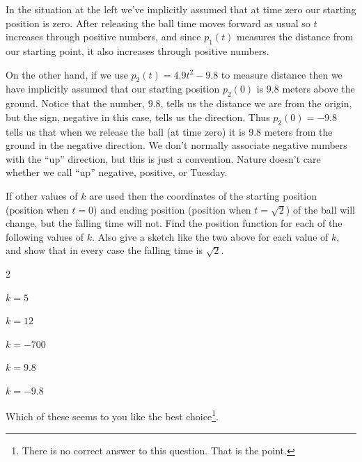 \begin{Digression}
  In the situation at the left we've implicitly assumed that at time
  zero our starting position is zero. After releasing the ball time
  moves forward as usual so $t$ increases through positive numbers,
  and since $p_1(t)$ measures the distance from our starting point, it
  also increases through positive numbers.

  On the other hand, if we use $p_2(t)=4.9t^2-9.8$ to measure distance
  then we have implicitly assumed that our starting position $p_2(0)$
  is $9.8$ meters above the ground. Notice that the number, $9.8$,
  tells us the distance we are from the origin, but the sign, negative
  in this case, tells us the direction. Thus $p_2(0)=-9.8$ tells us
  that when we release the ball (at time zero) it is 9.8 meters from
  the ground in the \alert{negative} direction. We don't normally
  associate negative numbers with the ``up'' direction, but this is
  just a convention. Nature doesn't care whether we call ``up''
  negative, positive, or Tuesday.

\begin{ProficiencyDrill}{}
  If other values of $k$ are used then the coordinates of the starting
  position (position when $t=0$) and ending position (position when
  $t=\sqrt{2}$) of the ball will change, but the falling time will
  not. Find the position function for each of the following values of
  $k.$ Also give a sketch like the two above for each value of $k,$
  and show that in every case the falling time is $\sqrt{2}.$
  \begin{enumerate}[label={\bf{}(\alph*)}]
  \begin{multicols}{2}
    \item $k=5$
    \item $k=12$
    \item $k=-700$
    \item $k=9.8$
    \item $k=-9.8$
  \end{multicols}
\end{enumerate}
Which of these seems to you like the best choice\footnote{There is
    no correct answer to this question. That is the point.}.
\end{ProficiencyDrill}




\end{Digression}
